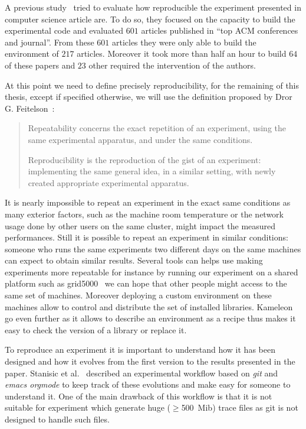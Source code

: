 A previous study~\cite{Collberg15Repeatability} tried to evaluate how
reproducible the experiment presented in computer science article are. To do
so, they focused on the capacity to build the experimental code and evaluated
$601$ articles published in “top ACM conferences and journal”. From these
$601$ articles they were only able to build the environment of $217$ articles.
Moreover it took more than half an hour to build $64$ of these papers and $23$
other required the intervention of the authors.

At this point we need to define precisely reproducibility, for the remaining
of this thesis, except if specified otherwise, we will use the definition
proposed by Dror G. Feitelson~\cite{Feitelson15From}:

\begin{quote}
    Repeatability concerns the exact repetition of an experiment, using the
    same experimental apparatus, and under the same conditions.

    Reproducibility is the reproduction of the gist of an experiment:
    implementing the same general idea, in a similar setting, with newly
    created appropriate experimental apparatus.
\end{quote}

It is nearly impossible to repeat an experiment in the exact same conditions
as many exterior factors, such as the machine room temperature or the network
usage done by other users   on the same cluster, might impact the measured
performances.
Still it is possible to repeat an experiment in similar conditions: someone
who runs the same experiments two different days on the same machines can
expect to obtain similar results. Several tools can helps use making
experiments more repeatable for instance by running our experiment on a shared
platform such as grid5000~\cite{Cappello05Grid5000} we can hope that other
people might access to the same set of machines. Moreover deploying a custom
environment on these machines allow to control and distribute the set of
installed libraries. Kameleon~\cite{Ruiz15Reconstructable} go even
further as it allows to describe an environment as a recipe thus makes it easy
to check the version of a library or replace it.

To reproduce an experiment it is important to understand how it has been
designed and how it evolves from the first version to the results presented in
the paper. Stanisic et al.~\cite[Chapter~4, p31-44]{Stanisic15Reproducible}
described an experimental workflow based on \emph{git} and \emph{emacs orgmode}
to keep track of these evolutions and make easy for someone to understand it.
One of the main drawback of this workflow is that it is not suitable for
experiment which generate huge ($\ge$\SI{500}{Mib}) trace files as git is not
designed to handle such files.

